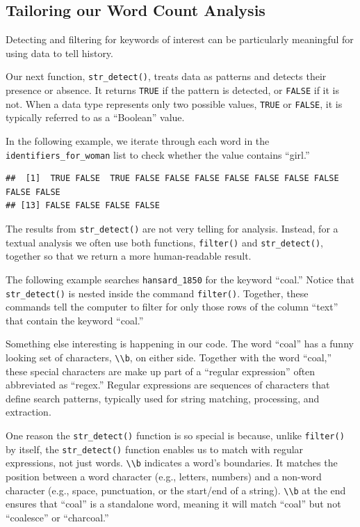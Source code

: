 \documentclass[
]{article}
\begin{document}
\subsection{Tailoring our Word Count
Analysis}\label{tailoring-our-word-count-analysis}

Detecting and filtering for keywords of interest can be particularly
meaningful for using data to tell history.

Our next function, \texttt{str\_detect()}, treats data as patterns and
detects their presence or absence. It returns \texttt{TRUE} if the
pattern is detected, or \texttt{FALSE} if it is not. When a data type
represents only two possible values, \texttt{TRUE} or \texttt{FALSE}, it
is typically referred to as a ``Boolean'' value.

In the following example, we iterate through each word in the
\texttt{identifiers\_for\_woman} list to check whether the value
contains ``girl.''

\begin{verbatim}
##  [1]  TRUE FALSE  TRUE FALSE FALSE FALSE FALSE FALSE FALSE FALSE FALSE FALSE
## [13] FALSE FALSE FALSE FALSE
\end{verbatim}

The results from \texttt{str\_detect()} are not very telling for
analysis. Instead, for a textual analysis we often use both functions,
\texttt{filter()} and \texttt{str\_detect()}, together so that we return
a more human-readable result.

The following example searches \texttt{hansard\_1850} for the keyword
``coal.'' Notice that \texttt{str\_detect()} is nested inside the
command \texttt{filter()}. Together, these commands tell the computer to
filter for only those rows of the column ``text'' that contain the
keyword ``coal.''

Something else interesting is happening in our code. The word ``coal''
has a funny looking set of characters,
\texttt{\textbackslash{}\textbackslash{}b}, on either side. Together
with the word ``coal,'' these special characters are make up part of a
``regular expression'' often abbreviated as ``regex.'' Regular
expressions are sequences of characters that define search patterns,
typically used for string matching, processing, and extraction.

One reason the \texttt{str\_detect()} function is so special is because,
unlike \texttt{filter()} by itself, the \texttt{str\_detect()} function
enables us to match with regular expressions, not just words.
\texttt{\textbackslash{}\textbackslash{}b} indicates a word's
boundaries. It matches the position between a word character (e.g.,
letters, numbers) and a non-word character (e.g., space, punctuation, or
the start/end of a string). \texttt{\textbackslash{}\textbackslash{}b}
at the end ensures that ``coal'' is a standalone word, meaning it will
match ``coal'' but not ``coalesce'' or ``charcoal.''
\end{document}
